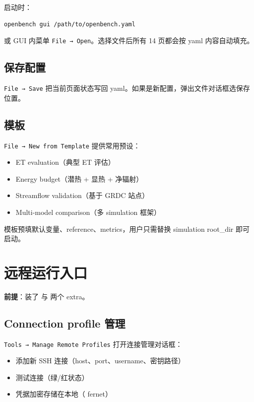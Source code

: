 启动时：

\begin{verbatim}
openbench gui /path/to/openbench.yaml
\end{verbatim}

或 GUI 内菜单 \texttt{File → Open}。选择文件后所有 14 页都会按 yaml 内容自动填充。

\subsection{保存配置}

\texttt{File → Save} 把当前页面状态写回 yaml。如果是新配置，弹出文件对话框选保存位置。

\subsection{模板}

\texttt{File → New from Template} 提供常用预设：

\begin{itemize}
  \item ET evaluation（典型 ET 评估）
  \item Energy budget（潜热 + 显热 + 净辐射）
  \item Streamflow validation（基于 GRDC 站点）
  \item Multi-model comparison（多 simulation 框架）
\end{itemize}

模板预填默认变量、reference、metrics，用户只需替换 simulation root\_dir 即可启动。

\section{远程运行入口}

\textbf{前提}：装了 \cli{[gui]} 与 \cli{[remote]} 两个 extra。

\subsection{Connection profile 管理}

\texttt{Tools → Manage Remote Profiles} 打开连接管理对话框：

\begin{itemize}
  \item 添加新 SSH 连接（host、port、username、密钥路径）
  \item 测试连接（绿/红状态）
  \item 凭据加密存储在本地（ fernet）
\end{itemize}

